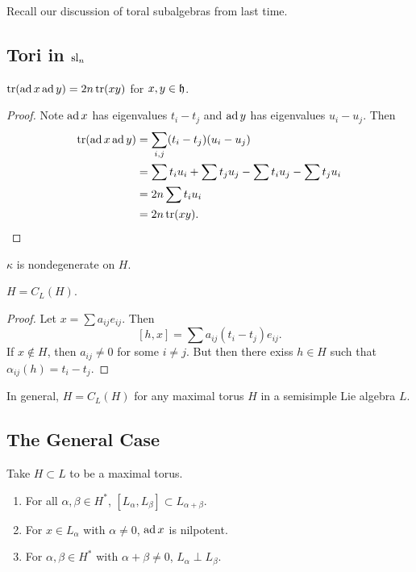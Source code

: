 \documentclass[twoside, 10pt]{article}
\begin{document}
    Recall our discussion of toral subalgebras from last time.

    \subsection{Tori in $\mathrm{sl}_n$}%

    \begin{prop} $\operatorname{tr}(\operatorname{ad} x \operatorname{ad} y) = 2n \operatorname{tr}(xy)$ for $x,y \in \mathfrak{h}$.
    \end{prop}

    \begin{proof} Note $\operatorname{ad} x$ has eigenvalues $t_i - t_j$ and $\operatorname{ad} y$ has
        eigenvalues $u_i - u_j$. Then \begin{align*} \operatorname{tr}(\operatorname{ad} x \operatorname{ad} y) &=
            \sum_{i,j} (t_i-t_j)(u_i-u_j) \\ &= \sum t_iu_i + \sum t_ju_j -
            \sum t_iu_j - \sum t_ju_i \\ &= 2n \sum t_iu_i \\ &= 2n \operatorname{tr}(xy).
        \end{align*} \end{proof}
    
    \begin{cor} $\kappa$ is nondegenerate on $H$.  \end{cor}

    \begin{prop} $H = C_L(H)$.  \end{prop}
    
    \begin{proof} Let $x = \sum a_{ij} e_{ij}$. Then \[ [h,x] = \sum
    a_{ij}(t_i-t_j)e_{ij}.\] If $x \notin H$, then $a_{ij} \neq 0$ for some $i
\neq j$. But then there exiss $h \in H$ such that $\alpha_{ij}(h) = t_i-t_j$.
\end{proof}    

    \begin{thm} In general, $H = C_L(H)$ for any maximal torus $H$ in a
    semisimple Lie algebra $L$.  \end{thm}
    
    \subsection{The General Case}%
    
    Take $H \subset L$ to be a maximal torus.

    \begin{prop} \begin{enumerate} \item For all $\alpha, \beta \in H^*$,
        $[L_{\alpha}, L_{\beta}] \subset L_{\alpha + \beta}$.  \item For $x \in
        L_{\alpha}$ with $\alpha \neq 0$, $\operatorname{ad} x$ is nilpotent.  \item For
        $\alpha, \beta \in H^*$ with $\alpha + \beta \neq 0$, $L_{\alpha} \perp
        L_{\beta}$.  \end{enumerate} \end{prop}
\end{document}
